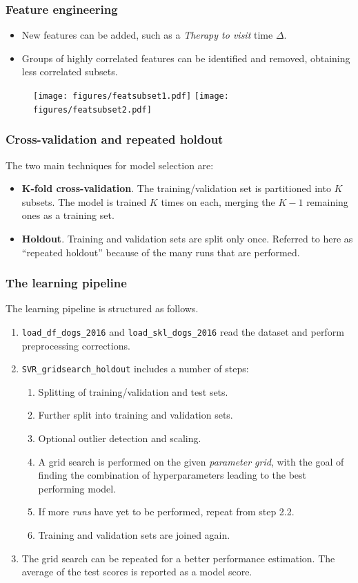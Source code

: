 \documentclass{beamer}
\newcommand{\nologo}{\setbeamertemplate{logo}{}}
\begin{document}
{\nologo
\begin{frame}
\frametitle{Feature engineering}
\begin{itemize}
\item New features can be added, such as a \textit{Therapy to visit} time $\Delta$.
\item Groups of highly correlated features can be identified and removed, obtaining less correlated subsets.
\end{itemize}
\begin{figure}[h]
  \centering
  	\texttt{[image: figures/featsubset1.pdf]}
  	\texttt{[image: figures/featsubset2.pdf]}
\end{figure}
\end{frame}}


\begin{frame}
\frametitle{Cross-validation and repeated holdout}
The two main techniques for model selection are:
\begin{itemize}
\item \textbf{K-fold cross-validation}. The training/validation set is partitioned into $ K $ subsets. The model is trained $K$ times on each, merging the $ K - 1 $ remaining ones as a training set.

\item \textbf{Holdout}. Training and validation sets are split only once. Referred to here as ``repeated holdout'' because of the many runs that are performed.
\end{itemize}
\end{frame}


\begin{frame}
\frametitle{The learning pipeline}
The learning pipeline is structured as follows.
\begin{enumerate}
\item \texttt{load\_df\_dogs\_2016} and \texttt{load\_skl\_dogs\_2016} read the dataset and perform preprocessing corrections.
\item \texttt{SVR\_gridsearch\_holdout} includes a number of steps:
\begin{enumerate}
\item Splitting of training/validation and test sets.
\item Further split into training and validation sets.
\item Optional outlier detection and scaling.
\item A grid search is performed on the given \textit{parameter grid}, with the goal of finding the combination of hyperparameters leading to the best performing model.
\item If more \textit{runs} have yet to be performed, repeat from step 2.2.
\item Training and validation sets are joined again.
\end{enumerate}
\item The grid search can be repeated for a better performance estimation. The average of the test scores is reported as a model score.
\end{enumerate}
\end{frame}
\end{document}
